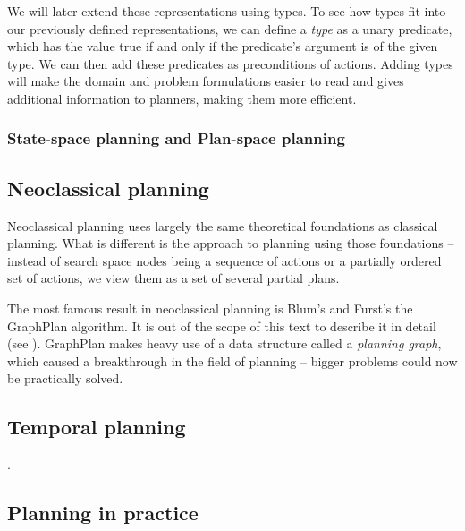We will later extend these representations using types.
To see how types fit into our previously defined representations, we can
define a \textit{type} as a unary predicate, which has the value true
if and only if the predicate's argument is of the given type.
We can then add these predicates as preconditions of actions.
Adding types will make the domain and problem formulations
easier to read and gives additional information
to planners, making them more efficient.
\cite[Section 2.4.1]{Ghallab2004}

\subsubsection{State-space planning and Plan-space planning}


\subsection{Neoclassical planning}

Neoclassical planning uses largely the same theoretical foundations as classical 
planning. What is different is the approach to planning using those foundations
-- instead of search space nodes being a sequence of actions or a partially ordered
set of actions, we view them as a set of several partial plans.
\cite[Part~II]{Ghallab2004}

The most famous result in neoclassical planning is Blum's and Furst's the GraphPlan algorithm. \cite{Blum1997}
It is out of the scope of this text to describe it in detail
(see \cite[Section~6.3]{Ghallab2004}).
GraphPlan makes heavy use of a data structure called a \textit{planning graph},
which caused a breakthrough in the field of planning -- bigger problems could
now be practically solved.


\subsection{Temporal planning}\label{temporal-planning}

.



\subsection{Planning in practice}

